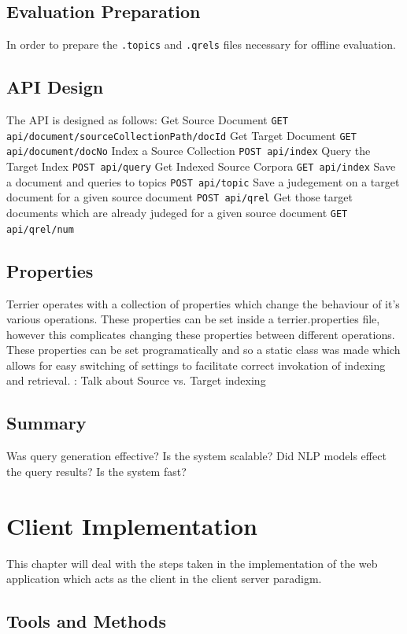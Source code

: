 \documentclass{l4proj}
\newcommand{\code}[1]{\texttt{#1}}
\begin{document}
\section{Evaluation Preparation}
In order to prepare the \code{.topics} and \code{.qrels} files necessary for offline evaluation.

\section{API Design}
The API is designed as follows:
Get Source Document
\code{GET api/document/{sourceCollectionPath}/{docId}}
Get Target Document
\code{GET api/document/{docNo}}
Index a Source Collection
\code{POST api/index}
Query the Target Index
\code{POST api/query}
Get Indexed Source Corpora
\code{GET api/index}
Save a document and queries to topics
\code{POST api/topic}
Save a judegement on a target document for a given source document
\code{POST api/qrel}
Get those target documents which are already judeged for a given source document
\code{GET api/qrel/{num}}

\section{Properties}
Terrier operates with a collection of properties which change the behaviour of it's various operations. These properties can be set inside a terrier.properties file, however this complicates changing these properties between different operations. These properties can be set programatically and so a static class was made which allows for easy switching of settings to facilitate correct invokation of indexing and retrieval. : Talk about Source vs. Target indexing

\section{Summary}
Was query generation effective?
Is the system scalable?
Did NLP models effect the query results?
Is the system fast?

\chapter{Client Implementation} \label{clientimplementation}
This chapter will deal with the steps taken in the implementation of the web application which acts as the client in the client server paradigm.

\section{Tools and Methods}
\end{document}
